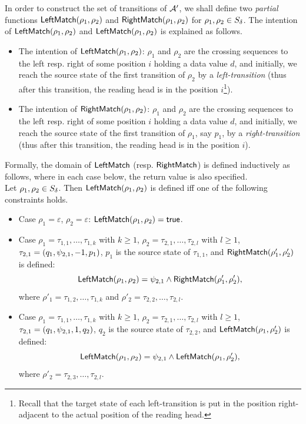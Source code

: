 In order to construct the set of transitions of $\mathcal{A}'$, we shall define two \emph{partial} functions $\mathsf{LeftMatch}(\rho_1, \rho_2)$ and $\mathsf{RightMatch}(\rho_1, \rho_2)$ for $\rho_1, \rho_2 \in S_{\delta}$. 
The intention of $\mathsf{LeftMatch}(\rho_1, \rho_2)$ and $\mathsf{LeftMatch}(\rho_1, \rho_2)$ is explained as follows.
\begin{itemize}
\item The intention of $\mathsf{LeftMatch}(\rho_1, \rho_2)$: $\rho_1$ and $\rho_2$ are the crossing sequences to the left resp. right of some position $i$ holding a data value $d$, and initially, we reach the source state of the first transition of $\rho_2$ by a \emph{left-transition} (thus after this transition, the reading head is in the position $i$\footnote{Recall that the target state of each left-transition is put in the position right-adjacent to the actual position of the reading head.}).
%
\item The intention of $\mathsf{RightMatch}(\rho_1, \rho_2)$:  $\rho_1$ and $\rho_2$ are the crossing sequences to the left resp. right of some position $i$ holding a data value $d$, and initially, we reach the source state of the first transition of $\rho_1$, say $p_1$, by a \emph{right-transition} (thus after this transition, the reading head is in the position $i$).
\end{itemize}
%
Formally, the domain of $\mathsf{LeftMatch}$ (resp. $\mathsf{RightMatch}$) is defined inductively as follows, where in each case below, the return value is also specified.  \\
Let $\rho_1, \rho_2 \in S_{\delta}$. Then $\mathsf{LeftMatch}(\rho_1, \rho_2)$ is defined iff one of the following constraints holds.
\begin{itemize}
\item Case $\rho_1 = \varepsilon$, $\rho_2 = \varepsilon$: $\mathsf{LeftMatch}(\rho_1, \rho_2) = \mathsf{true}$.
%
\item Case $\rho_1 =  \tau_{1,1}, \ldots, \tau_{1,k}$ with $k \ge 1$, $\rho_2 = \tau_{2,1}, \ldots, \tau_{2,l}$ with $l \ge 1$, $\tau_{2,1} = (q_1, \psi_{2,1}, -1, p_1)$, $p_1$ is the source state of $\tau_{1,1}$, and $\mathsf{RightMatch}(\rho'_1, \rho'_2)$ is defined:  
$$\mathsf{LeftMatch}(\rho_1, \rho_2) = \psi_{2,1} \wedge \mathsf{RightMatch}(\rho'_1, \rho'_2),$$ 
where $\rho'_1 = \tau_{1,2}, \ldots, \tau_{1,k}$ and $\rho'_2 = \tau_{2,2}, \ldots, \tau_{2,l}$.
%
\item Case $\rho_1 =  \tau_{1,1}, \ldots, \tau_{1,k}$ with $k \ge 1$, $\rho_2 = \tau_{2,1}, \ldots, \tau_{2,l}$ with $l \ge 1$, $\tau_{2,1} = (q_1, \psi_{2,1}, 1, q_2)$, $q_2$ is the source state of $\tau_{2,2}$, and $\mathsf{LeftMatch}(\rho_1, \rho'_2)$ is defined:  
$$\mathsf{LeftMatch}(\rho_1, \rho_2) = \psi_{2,1} \wedge \mathsf{LeftMatch}(\rho_1, \rho'_2),$$ 
where $\rho'_2 = \tau_{2,3}, \ldots, \tau_{2,l}$.
%
\end{itemize} 
